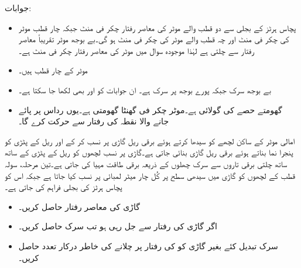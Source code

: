 جوابات:
\begin{itemize}
\item
پچاس ہرٹز کے بجلی سے دو قطب والے موٹر کی معاصر رفتار  چکر فی منٹ جبکہ چار قطب موٹر کی  چکر فی منٹ اور چہ قطب والے موٹر کی  چکر فی منٹ ہو گی۔بے بوجھ موٹر تقریباً معاصر رفتار سے چلتی ہے لہٰذا موجودہ سوال میں موٹر کی معاصر رفتار  چکر فی منٹ ہے۔
\item
موٹر کے چار قطب ہیں۔
\item
بے بوجھ سرک  جبکہ پورے بوجھ پر سرک  ہے۔ ان جوابات کو  اور  بھی لکھا جا سکتا ہے۔
\item
گھومتے حصے کی گولائی  ہے۔موٹر   چکر فی گھنٹا گھومتی ہے۔یوں رداس پر پائے جانے والا نقطہ  کی رفتار سے حرکت کرے گا۔
\end{itemize}
امالی موٹر کے  ساکن لچھے کو سیدھا کرتے ہوئے  برقی ریل گاڑی پر نسب کر کے اور ریل کے پٹڑی کو پنجرا نما بناتے ہوئے برقی ریل گاڑی بنائی جاتی ہے۔گاڑی پر نسب لچھوں کو ریل کے پٹڑی کے ساتھ ساتھ چلتی برقی تاروں سے سرک چھلوں کے ذریعہ برقی طاقت مہیا کی جاتی ہے۔تین مرحلہ، سولہ قطب کے لچھوں کو گاڑی میں سیدھی سطح پر کُل چار میٹر لمبائی پر نسب کیا جاتا ہے جبکہ اس کو پچاس ہرٹز کی بجلی فراہم کی جاتی ہے۔
\begin{itemize}
\item
گاڑی کی معاصر رفتار حاصل کریں۔
\item
اگر گاڑی  کی رفتار سے جل رہی ہو تب سرک حاصل کریں۔
\item
سرک تبدیل کئے بغیر گاڑی کو  کی رفتار پر چلانے کی خاطر درکار تعدد حاصل کریں۔ 
\end{itemize}   

